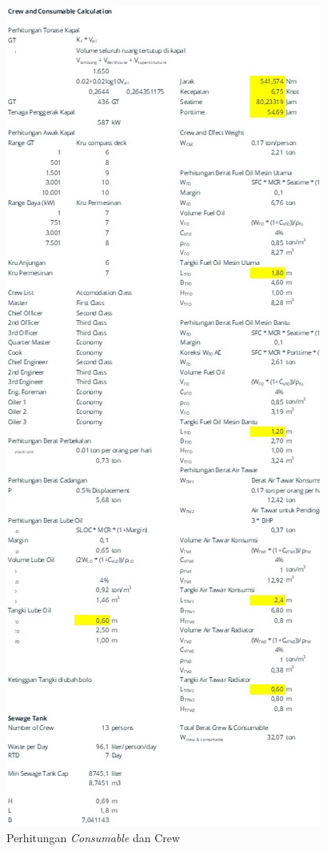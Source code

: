 \begin{figure}[!ht]
    \centering
    \includegraphics[width=\linewidth,height=\textheight,keepaspectratio]{lampiran/deskap-7.jpg}
    \caption*{Perhitungan \emph{Consumable} dan Crew}
\end{figure}

